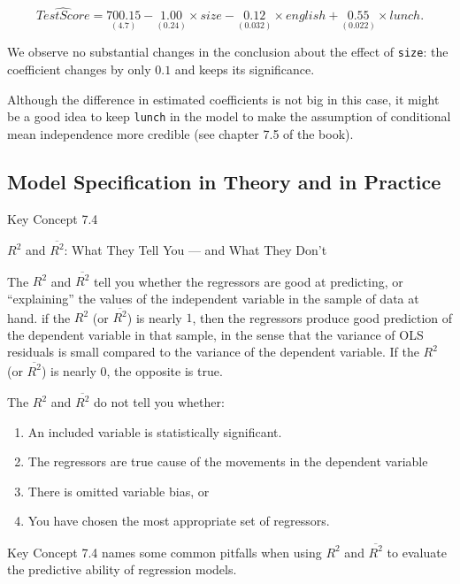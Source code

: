 \documentclass[]{book}
\providecommand{\tightlist}{%
  \setlength{\itemsep}{0pt}\setlength{\parskip}{0pt}}
\theoremstyle{definition}
\theoremstyle{definition}
\theoremstyle{definition}
\theoremstyle{remark}
\begin{document}
\[ \widehat{TestScore} = \underset{(4.7)}{700.15} - \underset{(0.24)}{1.00} \times size - \underset{(0.032)}{0.12} \times english + \underset{(0.022)}{0.55} \times lunch. \]

We observe no substantial changes in the conclusion about the effect of
\texttt{size}: the coefficient changes by only \(0.1\) and keeps its
significance.

Although the difference in estimated coefficients is not big in this
case, it might be a good idea to keep \texttt{lunch} in the model to
make the assumption of conditional mean independence more credible (see
chapter 7.5 of the book).

\subsection*{Model Specification in Theory and in
Practice}\label{model-specification-in-theory-and-in-practice}

Key Concept 7.4

\(R^2\) and \(\overline{R^2}\): What They Tell You --- and What They
Don't

The \(R^2\) and \(\overline{R^2}\) tell you whether the regressors are
good at predicting, or ``explaining'' the values of the independent
variable in the sample of data at hand. if the \(R^2\) (or
\(\overline{R^2}\)) is nearly \(1\), then the regressors produce good
prediction of the dependent variable in that sample, in the sense that
the variance of OLS residuals is small compared to the variance of the
dependent variable. If the \(R^2\) (or \(\overline{R^2}\)) is nearly
\(0\), the opposite is true.

The \(R^2\) and \(\overline{R^2}\) do not tell you whether:

\begin{enumerate}
\def\labelenumi{\arabic{enumi}.}
\tightlist
\item
  An included variable is statistically significant.
\item
  The regressors are true cause of the movements in the dependent
  variable
\item
  There is omitted variable bias, or
\item
  You have chosen the most appropriate set of regressors.
\end{enumerate}

Key Concept 7.4 names some common pitfalls when using \(R^2\) and
\(\overline{R^2}\) to evaluate the predictive ability of regression
models.
\end{document}

